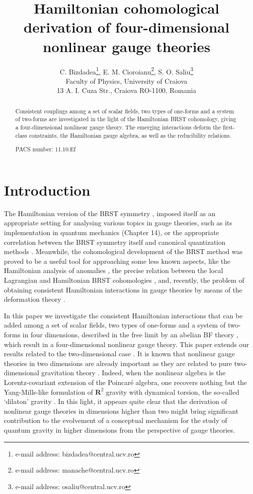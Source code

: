 \documentclass[a4paper,12pt]{article}
\begin{document}
\author{C. Bizdadea\thanks{%
e-mail address: bizdadea@central.ucv.ro}, E. M. Cioroianu\thanks{%
e-mail address: manache@central.ucv.ro}, S. O. Saliu\thanks{%
e-mail address: osaliu@central.ucv.ro} \\
Faculty of Physics, University of Craiova\\
13 A. I. Cuza Str., Craiova RO-1100, Romania}
\title{Hamiltonian cohomological derivation of four-dimensional nonlinear gauge
theories }
\maketitle

\begin{abstract}
Consistent couplings among a set of scalar fields, two types of one-forms
and a system of two-forms are investigated in the light of the Hamiltonian
BRST cohomology, giving a four-dimensional nonlinear gauge theory. The
emerging interactions deform the first-class constraints, the Hamiltonian
gauge algebra, as well as the reducibility relations.

PACS number: 11.10.Ef
\end{abstract}

\section{Introduction}

The Hamiltonian version of the BRST symmetry \cite{2}, \cite{8} imposed
itself as an appropriate setting for analysing various topics in gauge
theories, such as its implementation in quantum mechanics \cite{2} (Chapter
14), or the appropriate correlation between the BRST symmetry itself and
canonical quantization methods \cite{9}. Meanwhile, the cohomological
development of the BRST method was proved to be a useful tool for
approaching some less known aspects, like the Hamiltonian analysis of
anomalies \cite{10}, the precise relation between the local Lagrangian and
Hamiltonian BRST cohomologies \cite{11}, and, recently, the problem of
obtaining consistent Hamiltonian interactions in gauge theories by means of
the deformation theory \cite{12}.

In this paper we investigate the consistent Hamiltonian interactions that
can be added among a set of scalar fields, two types of one-forms and a
system of two-forms in four dimensions, described in the free limit by an
abelian BF theory \cite{13}, which result in a four-dimensional nonlinear
gauge theory. This paper extends our results related to the two-dimensional
case \cite{mpla}. It is known that nonlinear gauge theories in two
dimensions \cite{14} are already important as they are related to pure
two-dimensional gravitation theory \cite{15}. Indeed, when the nonlinear
algebra is the Lorentz-covariant extension of the Poincar\'{e} algebra, one
recovers nothing but the Yang-Mills-like formulation of $\mathbf{R}^{2}$
gravity with dynamical torsion, the so-called `dilaton' gravity \cite{16}.
In this light, it appears quite clear that the derivation of nonlinear gauge
theories in dimensions higher than two might bring significant contribution
to the evolvement of a conceptual mechanism for the study of quantum gravity
in higher dimensions from the perspective of gauge theories.
\end{document}
